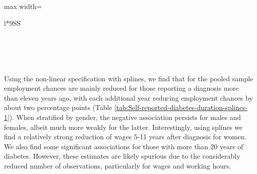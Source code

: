 \documentclass[12pt,english,british]{article}
\newcommand{\sym}[1]{\rlap{#1}}%
\begin{document}
\begin{table}[h]
\begin{center}
\begin{adjustbox}{max width=\textwidth}
{\begin{tabular}{l*{9}{SS}}
\\
\\
\\
\\
\multicolumn{10}{l}{\footnotesize \sym{*} \(p<0.10\), \sym{**} \(p<0.05\), \sym{***} \(p<0.01\)}\\
\end{tabular}
}

\end{adjustbox}
\end{center}
\end{table}  
  
  
  
Using the non-linear specification with splines, we find that for the pooled sample employment chances
are mainly reduced for those reporting a diagnosis more than eleven years
ago, with each additional year reducing employment chances by about
two percentage points (Table \ref{tab:Self-reported-diabetes-duration-splines-1}).
When stratified by gender, the
negative association persists for males and females, albeit much more weakly for the latter. Interestingly, using splines
we find a relatively strong reduction of wages 5-11 years after diagnosis
for women. We also find some significant associations for those with more than 20 years of diabetes. However, these estimates are likely spurious due to the considerably reduced number of observations, particularly for wages and working hours.
\end{document}
